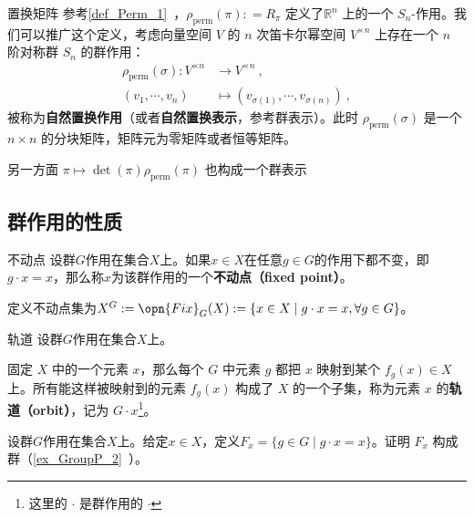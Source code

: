 \begin{example}{置换矩阵}
参考\autoref{def_Perm_1}~，$\rho_\text{perm}(\pi): = R_\pi$ 定义了$\mathbb{R}^n$ 上的一个 $S_n$-作用。我们可以推广这个定义，考虑向量空间 $V$ 的 $n$ 次笛卡尔幂空间 $V^{\times n}$ 上存在一个 $n$ 阶对称群 $S_n$ 的群作用：
\begin{equation}
\begin{aligned}
\rho_\text{perm}(\sigma): V^{\times n} &\to V^{\times n}~, \\
(v_1, \cdots, v_n) &\mapsto (v_{\sigma(1)}, \cdots, v_{\sigma(n)})~,
\end{aligned}
\end{equation}
被称为\textbf{自然置换作用}（或者\textbf{自然置换表示}，参考群表示）。此时 $\rho_\text{perm}(\sigma)$ 是一个 $n \times n$ 的分块矩阵，矩阵元为零矩阵或者恒等矩阵。

另一方面 $\pi \mapsto\det(\pi) \rho_\text{perm}(\pi)$ 也构成一个群表示
\end{example}


\subsection{群作用的性质}


\begin{definition}{不动点}\label{def_Group3_2}
设群$G$作用在集合$X$上。如果$x\in X$在任意$g\in G$的作用下都不变，即$g\cdot x=x$，那么称$x$为该群作用的一个\textbf{不动点（fixed point）}。

定义不动点集为$X^G: = \opn{Fix}_G(X): = \{x\in X\mid g\cdot x=x, \forall g\in G\}$。
\end{definition}




\begin{definition}{轨道}
设群$G$作用在集合$X$上。

固定 $X$ 中的一个元素 $x$，那么每个 $G$ 中元素 $g$ 都把 $x$ 映射到某个 $f_g(x)\in X$ 上。所有能这样被映射到的元素 $f_g(x)$ 构成了 $X$ 的一个子集，称为元素 $x$ 的\textbf{轨道（orbit）}，记为 $G \cdot x$\footnote{这里的 $\cdot$ 是群作用的 $\cdot$ }。
\end{definition}









\begin{exercise}{}\label{exe_Group3_1}
设群$G$作用在集合$X$上。给定$x\in X$，定义$F_x=\{g\in G\mid g\cdot x=x\}$。证明 $F_x$ 构成群（\autoref{ex_GroupP_2}~）。
\end{exercise}




